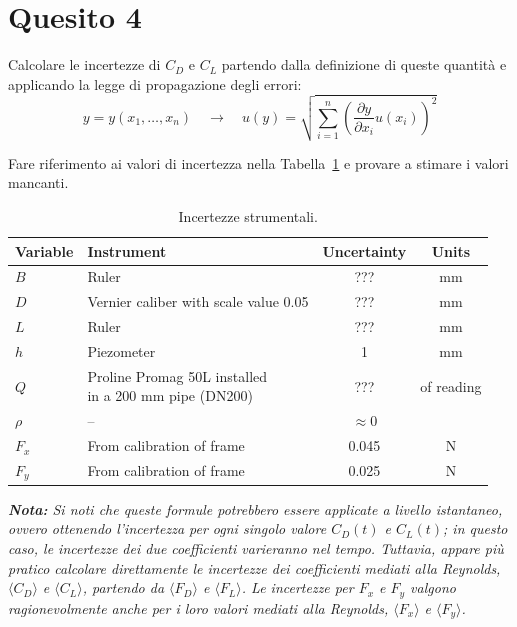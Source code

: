 \section*{Quesito 4}

Calcolare le incertezze di $C_D$ e $C_L$ partendo dalla definizione di queste quantità e applicando la legge di propagazione degli errori:
\begin{equation}\label{eq:test5q4}
y=y(x_1,\dots,x_n)\quad\rightarrow\quad
u(y) = \sqrt{\sum_{i=1}^{n} \left( \frac{\partial y}{\partial x_i} u(x_i) \right)^2}
\end{equation}

Fare riferimento ai valori di incertezza nella Tabella~\ref{tab:tab5-un} e provare a stimare i valori mancanti.

\begin{table}[H]
    \centering
    \begin{tabular}{llcc}
        \toprule
        \textbf{Variable} & \textbf{Instrument} & \textbf{Uncertainty} & \textbf{Units} \\
        \midrule
        $B$ & Ruler & ??? & mm \\
        $D$ & Vernier caliber with scale value 0.05 & ??? & mm \\
        $L$ & Ruler & ??? & mm \\
        $h$ & Piezometer & 1 & mm \\
        $Q$ & \parbox[t]{5cm}{Proline Promag 50L installed \\ in a 200 mm pipe (DN200)} & ??? & of reading \\
        $\rho$ & -- & $\approx 0$ &  \\
        $F_x$ & From calibration of frame & 0.045 & N \\
        $F_y$ & From calibration of frame & 0.025 & N \\
        \bottomrule
    \end{tabular}
    \caption{Incertezze strumentali.}
    \label{tab:tab5-un}
\end{table}

\emph{\textbf{Nota:} Si noti che queste formule potrebbero essere applicate a livello istantaneo, ovvero ottenendo l'incertezza per ogni singolo valore $C_D(t)$ e $C_L(t)$; in questo caso, le incertezze dei due coefficienti varieranno nel tempo. Tuttavia, appare più pratico calcolare direttamente le incertezze dei coefficienti mediati alla Reynolds, $\langle C_D\rangle$ e $\langle C_L\rangle$, partendo da $\langle F_D\rangle$ e $\langle F_L\rangle$. Le incertezze per $F_x$ e $F_y$ valgono ragionevolmente anche per i loro valori mediati alla Reynolds, $\langle F_x\rangle$ e $\langle F_y\rangle$.}

